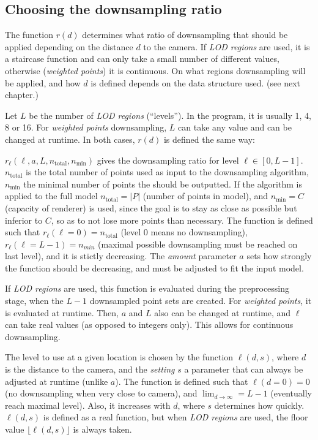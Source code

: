 \documentclass[a4paper,10pt,abstracton,notitlepage]{scrreprt}
\begin{document}
\subsection{Choosing the downsampling ratio}
The function $r(d)$ determines what ratio of downsampling that should be applied depending on the distance $d$ to the camera. If \emph{LOD regions} are used, it is a staircase function and can only take a small number of different values, otherwise (\emph{weighted points}) it is continuous. On what regions downsampling will be applied, and how $d$ is defined depends on the data structure used. (see next chapter.)

Let $L$ be the number of \emph{LOD regions} (``levels''). In the program, it is usually 1, 4, 8 or 16. For \emph{weighted points} downsampling, $L$ can take any value and can be changed at runtime. In both cases, $r(d)$ is defined the same way:

$r_{\ell}(\ell, a, L, n_{\text{total}}, n_{\min})$ gives the downsampling ratio for level $\ell \in [0, L-1]$. $n_{\text{total}}$ is the total number of points used as input to the downsampling algorithm, $n_{\min}$ the minimal number of points the should be outputted. If the algorithm is applied to the full model $n_{\text{total}} = |P|$ (number of points in model), and $n_{\min} = C$ (capacity of renderer) is used, since the goal is to stay as close as possible but inferior to $C$, so as to not lose more points than necessary. The function is defined such that $r_{\ell}(\ell = 0) = n_{\text{total}}$ (level 0 means no downsampling), $r_{\ell}(\ell = L-1) = n_{min}$ (maximal possible downsampling must be reached on last level), and it is stictly decreasing. The \emph{amount} parameter $a$ sets how strongly the function should be decreasing, and must be adjusted to fit the input model.

If \emph{LOD regions} are used, this function is evaluated during the preprocessing stage, when the $L-1$ downsampled point sets are created. For \emph{weighted points}, it is evaluated at runtime. Then, $a$ and $L$ also can be changed at runtime, and $\ell$ can take real values (as opposed to integers only). This allows for continuous downsampling.

The level to use at a given location is chosen by the function $\ell(d, s)$, where $d$ is the distance to the camera, and the \emph{setting} $s$ a parameter that can always be adjusted at runtime (unlike $a$). The function is defined such that $\ell(d = 0) = 0$ (no downsampling when very close to camera), and $\lim_{d \rightarrow \infty} = L-1$ (eventually reach maximal level). Also, it increases with $d$, where $s$ determines how quickly. $\ell(d, s)$ is defined as a real function, but when \emph{LOD regions} are used, the floor value $\lfloor \ell(d, s) \rfloor$ is always taken.
\end{document}
